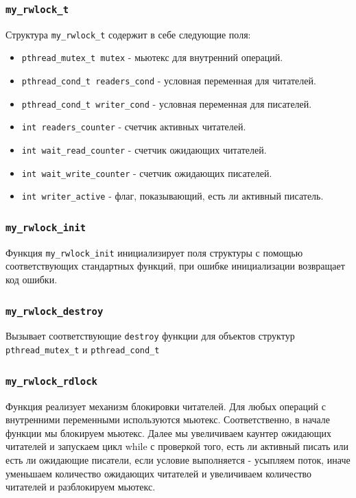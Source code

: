 \documentclass[12pt,a4paper]{article}
\begin{document}
\subsubsection{\texttt{my\_rwlock\_t}}
Структура \texttt{my\_rwlock\_t} содержит в себе следующие поля:
\begin{itemize}
  \item \texttt{pthread\_mutex\_t mutex} - мьютекс для внутренний операций. 
  \item \texttt{pthread\_cond\_t readers\_cond} - условная переменная для читателей.
  \item \texttt{pthread\_cond\_t writer\_cond} - условная переменная для писателей.
  \item \texttt{int readers\_counter} - счетчик активных читателей.
  \item \texttt{int wait\_read\_counter} - счетчик ожидающих читателей.
  \item \texttt{int wait\_write\_counter} - счетчик ожидающих писателей.
  \item \texttt{int writer\_active} - флаг, показывающий, есть ли активный писатель.
\end{itemize}
    

\subsubsection{\texttt{my\_rwlock\_init}}
Функция \texttt{my\_rwlock\_init} инициализирует поля структуры с помощью соответствующих стандартных функций, при ошибке инициализации возвращает код ошибки.

\subsubsection{\texttt{my\_rwlock\_destroy}}
Вызывает соответствующие \texttt{destroy} функции для объектов структур \texttt{pthread\_mutex\_t} и \texttt{pthread\_cond\_t}

\subsubsection{\texttt{my\_rwlock\_rdlock}}
Функция реализует механизм блокировки читателей. 
Для любых операций с внутренними переменными используются мьютекс. 
Соответственно, в начале функции мы блокируем мьютекс. 
Далее мы увеличиваем каунтер ожидающих читателей и запускаем цикл while с проверкой того, 
есть ли активный писать или есть ли ожидающие писатели, если условие выполняется - усыпляем поток, 
иначе уменьшаем количество ожидающих читателей и увеличиваем количество читателей и разблокируем мьютекс.
\end{document}
